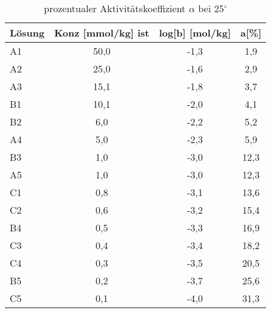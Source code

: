 \begin{table}[H]
  \centering
  \caption{prozentualer Aktivitätskoeffizient $\alpha$ bei 25$^\circ$}
    \begin{tabular}{lccc}
    \toprule
    \textbf{Lösung} & \multicolumn{1}{l}{\textbf{Konz [mmol/kg] ist}} & \multicolumn{1}{l}{\textbf{log[b] [mol/kg]}} & \multicolumn{1}{l}{\textbf{a[\%]}} \\
    \midrule
    A1    & 50,0  & -1,3  & 1,9 \\
    A2    & 25,0  & -1,6  & 2,9 \\
    A3    & 15,1  & -1,8  & 3,7 \\
    B1    & 10,1  & -2,0  & 4,1 \\
    B2    & 6,0   & -2,2  & 5,2 \\
    A4    & 5,0   & -2,3  & 5,9 \\
    B3    & 1,0   & -3,0  & 12,3 \\
    A5    & 1,0   & -3,0  & 12,3 \\
    C1    & 0,8   & -3,1  & 13,6 \\
    C2    & 0,6   & -3,2  & 15,4 \\
    B4    & 0,5   & -3,3  & 16,9 \\
    C3    & 0,4   & -3,4  & 18,2 \\
    C4    & 0,3   & -3,5  & 20,5 \\
    B5    & 0,2   & -3,7  & 25,6 \\
    C5    & 0,1   & -4,0  & 31,3 \\
    \bottomrule
    \end{tabular}%
  \label{}%
\end{table}%
